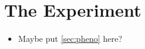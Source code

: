 \chapter{The Experiment}
\label{sec:lhc}
\begin{itemize}
\item Maybe put \cref{sec:pheno} here?
\end{itemize}


